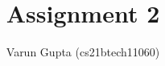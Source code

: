 \documentclass[journal,12pt,twocolumn]{IEEEtran}
\begin{document}
\let\vec\mathbf
\def\putbox#1#2#3{\makebox[0in][l]{\makebox[#1][l]{}\raisebox{\baselineskip}[0in][0in]{\raisebox{#2}[0in][0in]{#3}}}}
\def\rightbox#1{\makebox[0in][r]{#1}}
\def\centbox#1{\makebox[0in]{#1}}
\def\topbox#1{\raisebox{-\baselineskip}[0in][0in]{#1}}
\def\midbox#1{\raisebox{-0.5\baselineskip}[0in][0in]{#1}}
\title{
    Assignment 2
}
\author{ Varun Gupta (cs21btech11060)%
}
\graphicspath{{figures/}}
%
%
%
% 
%
\end{document}
